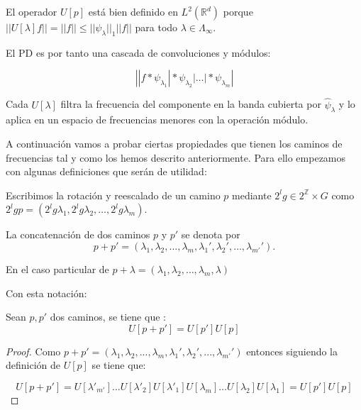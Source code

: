 \noindent El operador $U[p]$ está bien definido en $L^2(\mathbb{R}^d)$ porque $\left|\left| U[\lambda]f \right|\right| = ||f|| \leq ||\psi_\lambda||_1 ||f||$ para todo $\lambda \in \Lambda_\infty$. 

\noindent El PD es por tanto una cascada de convoluciones y módulos: 

\begin{equation}
  \left| |f \ast \psi_{\lambda_1} | \ast \psi_{\lambda_2} | \ldots | \ast \psi_{\lambda_m} \right|  
\end{equation}

\medskip

\noindent Cada $U[\lambda]$ filtra la frecuencia del componente en la banda cubierta por $\widehat{\psi}_\lambda$ y lo aplica en un espacio de frecuencias menores con la operación módulo.

\noindent A continuación vamos a probar ciertas propiedades que tienen los caminos de frecuencias tal y como los hemos descrito anteriormente. Para ello empezamos con algunas definiciones que serán de utilidad:

\begin{definicion}
Escribimos la rotación y reescalado de un camino $p$ mediante $2^lg \in 2^\mathbb{Z}\times G$ como $2^lgp=(2^lg\lambda_1,2^lg\lambda_2,\ldots,2^lg\lambda_m)$.
\end{definicion}

\begin{definicion}
La concatenación de dos caminos $p$ y $p'$ se denota por $$p+p'=(\lambda_1,\lambda_2,\ldots,\lambda_m,\lambda_1',\lambda_2',\ldots,\lambda_{m'}').$$

\noindent En el caso particular de $p+\lambda=(\lambda_1,\lambda_2,\ldots,\lambda_m,\lambda)$
\end{definicion}

\noindent Con esta notación: 

\begin{proposicion} \label{proposicionSumaCaminos}
Sean $p, p'$ dos caminos, se tiene que :
$$U[p+p']=U[p']U[p]$$
\end{proposicion}

\begin{proof}
Como $p+p'=(\lambda_1,\lambda_2,...,\lambda_m,\lambda_1',\lambda_2',...,\lambda_{m'}')$ entonces siguiendo la definición de $U[p]$ se tiene que: 

\begin{equation}
  U[p+p']=U[\lambda'_{m'}]\ldots U[\lambda'_2]U[\lambda'_1]U[\lambda_{m}]\ldots U[\lambda_2]U[\lambda_1]=U[p']U[p] 
\end{equation}
\end{proof}

